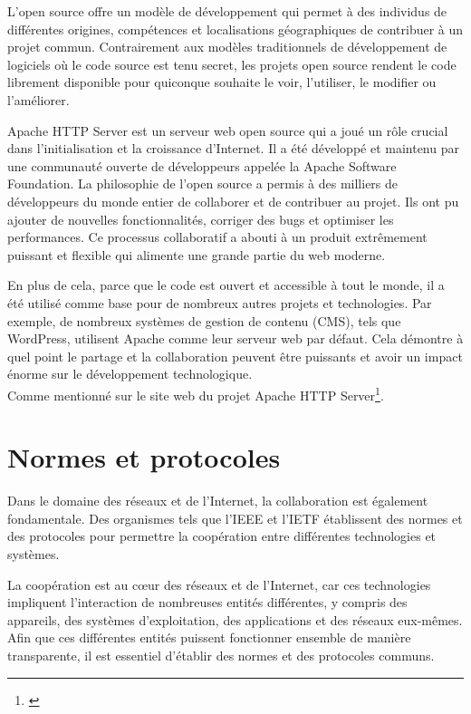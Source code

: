 L'open source offre un modèle de développement qui permet à des individus de différentes origines, compétences et localisations géographiques de contribuer à un projet commun. Contrairement aux modèles traditionnels de développement de logiciels où le code source est tenu secret, les projets open source rendent le code librement disponible pour quiconque souhaite le voir, l'utiliser, le modifier ou l'améliorer.

Apache HTTP Server est un serveur web open source qui a joué un rôle crucial dans l'initialisation et la croissance d'Internet. Il a été développé et maintenu par une communauté ouverte de développeurs appelée la Apache Software Foundation.
La philosophie de l'open source a permis à des milliers de développeurs du monde entier de collaborer et de contribuer au projet. Ils ont pu ajouter de nouvelles fonctionnalités, corriger des bugs et optimiser les performances. Ce processus collaboratif a abouti à un produit extrêmement puissant et flexible qui alimente une grande partie du web moderne.

En plus de cela, parce que le code est ouvert et accessible à  tout le monde, il a été utilisé comme base pour de nombreux autres projets et technologies. Par exemple, de nombreux systèmes de gestion de contenu (CMS), tels que WordPress, utilisent Apache comme leur serveur web par défaut. Cela démontre à quel point le partage et la collaboration peuvent être puissants et avoir un impact énorme sur le développement technologique.\\

Comme mentionné sur le site web du projet Apache HTTP Server\footnote{\cite{apache}}.

\section{Normes et protocoles} 
Dans le domaine des réseaux et de l'Internet, la collaboration est également fondamentale. Des organismes tels que l'IEEE et l'IETF établissent des normes et des protocoles pour permettre la coopération entre différentes technologies et systèmes.

La coopération est au cœur des réseaux et de l'Internet, car ces technologies impliquent l'interaction de nombreuses entités différentes, y compris des appareils, des systèmes d'exploitation, des applications et des réseaux eux-mêmes. Afin que ces différentes entités puissent fonctionner ensemble de manière transparente, il est essentiel d'établir des normes et des protocoles communs.

